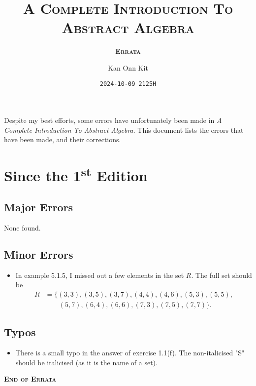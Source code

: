 \documentclass[
    a4paper,
    chapterprefix,
    DIV=9
]{scrartcl}
\title{\bfseries\scshape A Complete Introduction To\\Abstract Algebra}
\subtitle{\bfseries\scshape Errata}
\date{\texttt{2024-10-09 2125H}}
\author{Kan Onn Kit}
\begin{document}
\maketitle

Despite my best efforts, some errors have unfortunately been made in \textit{A Complete Introduction To Abstract Algebra}. This document lists the errors that have been made, and their corrections.

\section*{Since the 1\textsuperscript{st} Edition}
\subsection*{Major Errors}
None found.

\subsection*{Minor Errors}
\begin{itemize}
    \item In example 5.1.5, I missed out a few elements in the set $R$. The full set should be
    \begin{align*}
        R &= \{(3, 3), (3, 5), (3, 7), (4, 4), (4, 6), (5, 3), (5, 5),\\
        &\quad\quad(5, 7), (6, 4), (6, 6), (7, 3), (7, 5), (7, 7)\}.
    \end{align*}
\end{itemize}

\subsection*{Typos}
\begin{itemize}
    \item There is a small typo in the answer of exercise 1.1(f). The non-italicised "S" should be italicised (as it is the name of a set).
\end{itemize}

\begin{center}
    \vfill
    {\Large\bfseries\scshape End of Errata}
\end{center}
\end{document}
